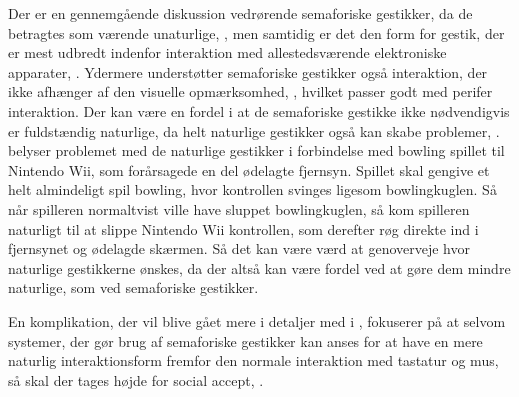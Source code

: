 Der er en gennemgående diskussion vedrørende semaforiske gestikker, da de betragtes som værende unaturlige, \parencite[s. 1961]{PDF:AStudyOnTheUseOfSemaphoricGestures}, men samtidig er det den form for gestik, der er mest udbredt indenfor interaktion med allestedsværende elektroniske apparater, \parencite[s. 28]{PDF:ATaxonomyOfGestures}. Ydermere understøtter semaforiske gestikker også interaktion, der ikke afhænger af den visuelle opmærksomhed, \parencite[s. 1964]{PDF:AStudyOnTheUseOfSemaphoricGestures}, hvilket passer godt med perifer interaktion. Der kan være en fordel i at de semaforiske gestikke ikke nødvendigvis er fuldstændig naturlige, da helt naturlige gestikker også kan skabe problemer, \parencite[s. 9]{PDF:NaturalUserInterfaces}. \textcite[s. 9]{PDF:NaturalUserInterfaces} belyser problemet med de naturlige gestikker i forbindelse med bowling spillet til Nintendo Wii, som forårsagede en del ødelagte fjernsyn. Spillet skal gengive et helt almindeligt spil bowling, hvor kontrollen svinges ligesom bowlingkuglen. Så når spilleren normaltvist ville have sluppet bowlingkuglen, så kom spilleren naturligt til at slippe Nintendo Wii kontrollen, som derefter røg direkte ind i fjernsynet og ødelagde skærmen. Så det kan være værd at genoverveje hvor naturlige gestikkerne ønskes, da der altså kan være fordel ved at gøre dem mindre naturlige, som ved semaforiske gestikker.

En komplikation, der vil blive gået mere i detaljer med i , fokuserer på at selvom systemer, der gør brug af semaforiske gestikker kan anses for at have en mere naturlig interaktionsform fremfor den normale interaktion med tastatur og mus, så skal der tages højde for social accept, \parencite[s. 275]{PDF:WouldYouDoThat}. 
%
